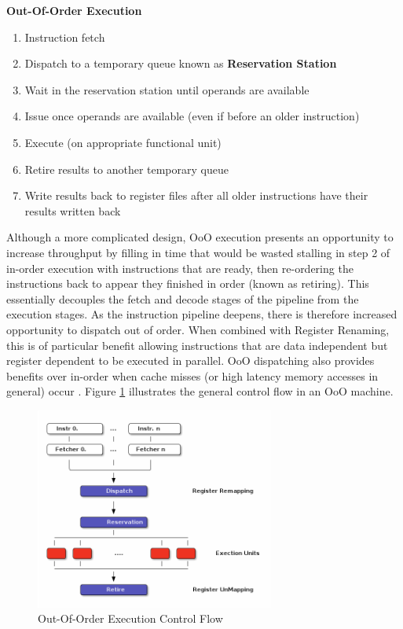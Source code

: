 \documentclass[12pt]{report}
\begin{document}
\noindent
\textbf{Out-Of-Order Execution}
\begin{enumerate}
\item Instruction fetch
\item Dispatch to a temporary queue known as \textbf{Reservation Station}
\item Wait in the reservation station until operands are available
\item Issue once operands are available (even if before an older
instruction)
\item Execute (on appropriate functional unit)
\item Retire results to another temporary queue
\item Write results back to register files after all older instructions have their results written back
\end{enumerate}

Although a more complicated design, OoO execution presents an opportunity to
increase throughput by filling in time that would be wasted stalling in step
2 of in-order execution with instructions that are ready, then re-ordering
the instructions back to appear they finished in order (known as retiring).
This essentially decouples the fetch and decode stages of the pipeline from
the execution stages. As the instruction pipeline deepens, there is therefore
increased opportunity to dispatch out of order. When combined with Register
Renaming, this is of particular benefit allowing instructions that are data
independent but register dependent to be executed in parallel. OoO
dispatching also provides benefits over in-order when cache misses (or high
latency memory accesses in general) occur \parencite{stark1997reducing}.
Figure \ref{fig:OutOfOrder} illustrates the general control flow in an OoO machine.

\begin{figure}[htbp]
\centering
\includegraphics[width=0.7\textwidth]{figures/OoODiagram.png}
\caption{\label{fig:OutOfOrder}Out-Of-Order Execution Control Flow}
\end{figure}
\end{document}
